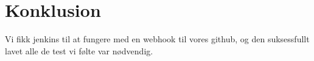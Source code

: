 \section{Konklusion}

Vi fikk jenkins til at fungere med en webhook til vores github, og den suksessfullt lavet alle de test vi følte var nødvendig.